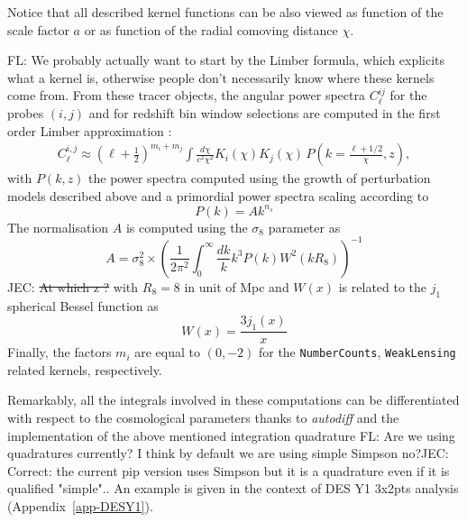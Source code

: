 \documentclass[twocolumn,twocolappendix,nofootinbib,iop]{openjournal}
\newcommand{\FrL}[1]{{\color{cyan}FL: #1}}
\newcommand{\JZ}[1]{{\color{purple}JZ: #1}}
\newcommand{\JEC}[1]{{\color{magenta}JEC: #1}}
\begin{document}
Notice that all described kernel functions can be also viewed as function of the scale factor $a$ or as function of the radial comoving distance $\chi$. 

\FrL{We probably actually want to start by the Limber formula, which explicits what a kernel is, otherwise people don't necessarily know where these kernels come from.}
From these tracer objects, the angular power spectra $C_\ell^{ij}$ for the probes $(i,j)$ and for redshift bin window selections are computed in the first order Limber approximation \citep{PhysRevD.78.123506}:
\begin{align}
    C_\ell^{i,j} \approx \left(\ell+\frac{1}{2}\right)^{m_i+m_j}\int\frac{d\chi}{c^2\chi^2}K_i(\chi)K_j(\chi)\,P\left(k=\frac{\ell+1/2}{\chi},z\right),\label{eq:Cell_limber}
\end{align}
with $P(k,z)$ the power spectra computed using the growth of perturbation models described above and a primordial power spectra scaling according to
\begin{equation}
    P(k) = A k^{n_s}
\end{equation}
The normalisation $A$ is computed using the $\sigma_8$ parameter as 
\begin{equation}
    A = \sigma_8^2 \times \left(\frac{1}{2 \pi^2} \int_0^\infty \frac{dk}{k} k^3 P(k) W^2(kR_8) \right)^{-1}
\end{equation}
\JEC{\st{At which z ?}}
with $R_8 = 8$ in unit of Mpc and $W(x)$ is related to the $j_1$ spherical Bessel function as
\begin{equation}
    W(x) = \frac{3j_1(x)}{x}
\end{equation}
Finally, the factors $m_i$ are equal to $(0,-2)$ for the \texttt{NumberCounts}, \texttt{WeakLensing} related kernels, respectively. 

Remarkably, all the integrals involved in these computations can be  differentiated with respect to the cosmological parameters thanks to \textit{autodiff} and the implementation of the above mentioned integration quadrature \FrL{Are we using quadratures currently? I think by default we are using simple Simpson no?}\JEC{Correct: the current pip version uses Simpson but it is a quadrature even if it is qualified "simple".}.  An example is given in the context of DES Y1 3x2pts analysis (Appendix~\ref{app-DESY1}).
%
\end{document}
